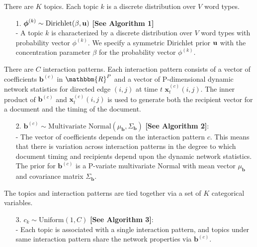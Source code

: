 \documentclass[a4paper]{article}
\begin{document}
There are $K$ topics. Each topic $k$ is a discrete distribution over $V$ word types.
\begin{itemize}
	\item[1.] {$\boldsymbol{\phi}^{(k)} \sim \mbox{Dirichlet}(\beta, \bf u)$} \textbf{[See Algorithm 1]}\\
	- A topic $k$ is characterized by a discrete distribution over $V$ word types with probability vector $\phi^{(k)}$. We specify a symmetric Dirichlet prior $\bf u$ with the concentration parameter $\beta$ for the probability vector $\phi^{(k)}$.
\end{itemize}
\noindent There are $C$ interaction patterns. Each interaction pattern consists of a vector of coefficients $\boldsymbol{b}^{(c)}$ in $\mathbbm{R}^{P}$ and a vector of P-dimensional dynamic network statistics for directed edge $(i, j)$ at time $t$ $\boldsymbol{x}^{(c)}_t(i, j)$. The inner product of $\boldsymbol{b}^{(c)}$ and $\boldsymbol{x}^{(c)}_t(i, j)$ is used to generate both the recipient vector for a document and the timing of the document.
\begin{itemize}
	\item[2.] $\boldsymbol{b}^{(c)}\sim \mbox{Multivariate Normal}(\mu_{\boldsymbol{b}}, \Sigma_{\boldsymbol{b}})$ \textbf{[See Algorithm 2]}: \\
		- The vector of coefficients depends on the interaction pattern $c$. This means that there is variation across interaction patterns in the degree to which document timing and recipients depend upon the dynamic network statistics. The prior for $\boldsymbol{b}^{(c)}$ is a P-variate multivariate Normal with mean vector $\mu_{\boldsymbol{b}}$ and covariance matrix $\Sigma_{\boldsymbol{b}}$.
	\end{itemize}
\noindent The topics and interaction patterns are tied together via a set of $K$ categorical variables.
\begin{itemize}
	\item[3.] $c_k\sim \mbox{Uniform}(1, C)$ \textbf{[See Algorithm 3]}: \\
	- Each topic is associated with a single interaction pattern, and topics under same interaction pattern share the network properties via $\boldsymbol{b}^{(c)}$.
\end{itemize}
\end{document}
